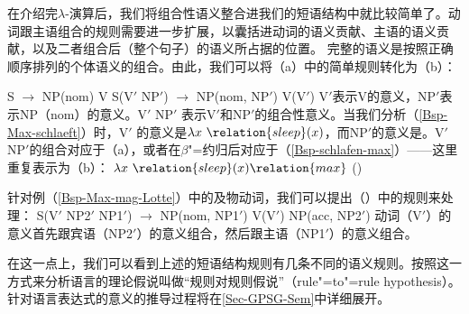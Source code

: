 \begin{sloppypar}
\noindent
在介绍完$\lambda$-演算后，我们将组合性语义整合进我们的短语结构中就比较简单了。动词跟主语组合的规则需要进一步扩展，以囊括进动词的语义贡献、主语的语义贡献，以及二者组合后（整个句子）的语义所占据的位置。
  完整的语义是按照正确顺序排列的个体语义的组合。由此，我们可以将（a）中的简单规则转化为（b）：
\end{sloppypar}
\eal
\ex S $\to$ NP(nom) V
\ex S(V$'$ NP$'$) $\to$ NP(nom, NP$'$) V(V$'$)
\zl
V$'$表示V的意义，NP$'$表示NP（nom）的意义。V$'$ NP$'$ 表示V$'$和NP$'$的组合性意义。当我们分析（\ref{Bsp-Max-schlaeft}）时，V$'$ 的意义是$\lambda x~\relation{sleep}(x)$，而NP$'$的意义是。V$'$ NP$'$的组合对应于（a），或者在$\beta$"=约归后对应于（\ref{Bsp-schlafen-max}）——这里重复表示为（b）：
\eal
\ex $\lambda x~\relation{sleep}(x) \relation{max}$
\ex {}()
\zl

\noindent
针对例（\ref{Bsp-Max-mag-Lotte}）中的及物动词，我们可以提出（）中的规则来处理：
\ea
S(V$'$ NP2$'$ NP1$'$) $\to$ NP(nom, NP1$'$) V(V$'$) NP(acc, NP2$'$)
\z
动词（V$'$）的意义首先跟宾语（NP2$'$）的意义组合，然后跟主语（NP1$'$）的意义组合。

在这一点上，我们可以看到上述的短语结构规则有几条不同的语义规则。按照这一方式来分析语言的理论假说叫做“规则对规则假说”（rule"=to"=rule hypothesis）\citep[]{Bach76a}。针对语言表达式的意义的推导过程将在\ref{Sec-GPSG-Sem}中详细展开。

